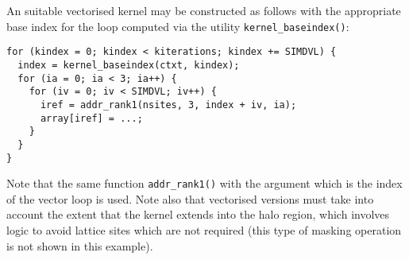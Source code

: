 An suitable  vectorised kernel may be constructed as follows with the
appropriate base index for the loop computed via the utility
\texttt{kernel\_baseindex()}:
\begin{lstlisting}
for (kindex = 0; kindex < kiterations; kindex += SIMDVL) {
  index = kernel_baseindex(ctxt, kindex);
  for (ia = 0; ia < 3; ia++) {
    for (iv = 0; iv < SIMDVL; iv++) {
      iref = addr_rank1(nsites, 3, index + iv, ia);
      array[iref] = ...;
    }
  }
}
\end{lstlisting}
Note that the same function \texttt{addr\_rank1()} with the 
argument which is the index of the vector loop is used. Note also that
vectorised versions must take into account the extent that the kernel
extends into the halo region, which involves
logic to avoid lattice sites which are not required (this type of
masking operation is not shown in this
example).

\vfill
\pagebreak


